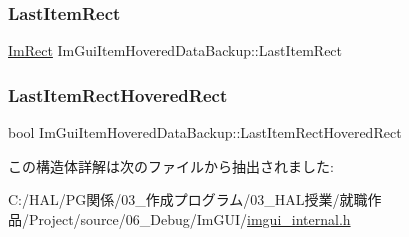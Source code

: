 \subsubsection{\texorpdfstring{Last\+Item\+Rect}{LastItemRect}}
{\footnotesize\ttfamily \mbox{\hyperlink{struct_im_rect}{Im\+Rect}} Im\+Gui\+Item\+Hovered\+Data\+Backup\+::\+Last\+Item\+Rect}

\mbox{\label{struct_im_gui_item_hovered_data_backup_a48dd47c573d5299de25be908d77f23f0}} 
\subsubsection{\texorpdfstring{Last\+Item\+Rect\+Hovered\+Rect}{LastItemRectHoveredRect}}
{\footnotesize\ttfamily bool Im\+Gui\+Item\+Hovered\+Data\+Backup\+::\+Last\+Item\+Rect\+Hovered\+Rect}



この構造体詳解は次のファイルから抽出されました\+:\begin{DoxyCompactItemize}
\item 
C\+:/\+H\+A\+L/\+P\+G関係/03\+\_\+作成プログラム/03\+\_\+\+H\+A\+L授業/就職作品/\+Project/source/06\+\_\+\+Debug/\+Im\+G\+U\+I/\mbox{\hyperlink{imgui__internal_8h}{imgui\+\_\+internal.\+h}}\end{DoxyCompactItemize}
